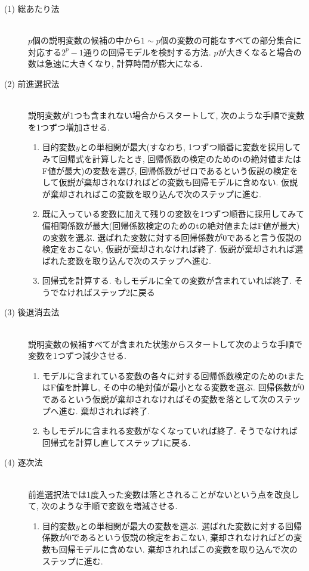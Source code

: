 \begin{description}
  \item[(1) 総あたり法]\mbox{}\\
  $p$個の説明変数の候補の中から$1\sim p$個の変数の可能なすべての部分集合に対応する$2^p-1$通りの回帰モデルを検討する方法. $p$が大きくなると場合の数は急速に大きくなり, 計算時間が膨大になる. 
  \item[(2) 前進選択法]\mbox{}\\
  説明変数が1つも含まれない場合からスタートして, 次のような手順で変数を1つずつ増加させる. 
  \begin{enumerate}
    \item 目的変数$y$との単相関が最大(すなわち, 1つずつ順番に変数を採用してみて回帰式を計算したとき, 回帰係数の検定のためのtの絶対値またはF値が最大)の変数を選び, 回帰係数がゼロであるという仮説の検定をして仮説が棄却されなければどの変数も回帰モデルに含めない. 仮説が棄却されればこの変数を取り込んで次のステップに進む. 
    \item 既に入っている変数に加えて残りの変数を1つずつ順番に採用してみて偏相関係数が最大(回帰係数検定のためのtの絶対値またはF値が最大)の変数を選ぶ. 選ばれた変数に対する回帰係数が0であると言う仮説の検定をおこない, 仮説が棄却されなければ終了. 仮説が棄却されれば選ばれた変数を取り込んで次のステップへ進む. 
    \item 回帰式を計算する. もしモデルに全ての変数が含まれていれば終了. そうでなければステップ2に戻る
  \end{enumerate}
  \item [(3) 後退消去法]\mbox{}\\
  説明変数の候補すべてが含まれた状態からスタートして次のような手順で変数を1つずつ減少させる. 
  \begin{enumerate}
    \item モデルに含まれている変数の各々に対する回帰係数検定のためのtまたはF値を計算し, その中の絶対値が最小となる変数を選ぶ. 回帰係数が0であるという仮説が棄却されなければその変数を落として次のステップへ進む. 棄却されれば終了. 
    \item もしモデルに含まれる変数がなくなっていれば終了. そうでなければ回帰式を計算し直してステップ1に戻る. 
  \end{enumerate}
  \item [(4) 逐次法]\mbox{}\\
  前進選択法では1度入った変数は落とされることがないという点を改良して, 次のような手順で変数を増減させる. 
  \begin{enumerate}
    \item 目的変数$y$との単相関が最大の変数を選ぶ. 選ばれた変数に対する回帰係数が0であるという仮説の検定をおこない, 棄却されなければどの変数も回帰モデルに含めない. 棄却されればこの変数を取り込んで次のステップに進む. 

\end{enumerate}
\end{description}
